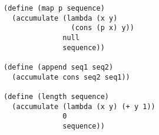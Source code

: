 \documentclass[a4paper,12pt]{article}
\begin{document}
\begin{lstlisting}
(define (map p sequence)
  (accumulate (lambda (x y)
                (cons (p x) y))
              null
              sequence))

(define (append seq1 seq2)
  (accumulate cons seq2 seq1))

(define (length sequence)
  (accumulate (lambda (x y) (+ y 1))
              0
              sequence))
\end{lstlisting}
\end{document}
